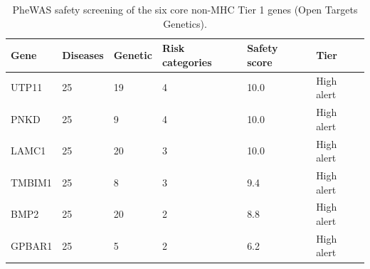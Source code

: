 \begin{table}[htbp]
\centering
\caption{PheWAS safety screening of the six core non-MHC Tier 1 genes (Open Targets Genetics).}\label{tab:phewas_safety}
\small
\begin{tabular}{llllll}
\toprule
  Gene & Diseases & Genetic & Risk categories & Safety score & Tier \\
\midrule
  UTP11 & 25 & 19 & 4 & 10.0 & High alert \\
  PNKD & 25 & 9 & 4 & 10.0 & High alert \\
  LAMC1 & 25 & 20 & 3 & 10.0 & High alert \\
  TMBIM1 & 25 & 8 & 3 & 9.4 & High alert \\
  BMP2 & 25 & 20 & 2 & 8.8 & High alert \\
  GPBAR1 & 25 & 5 & 2 & 6.2 & High alert \\
\bottomrule
\end{tabular}

\end{table}

